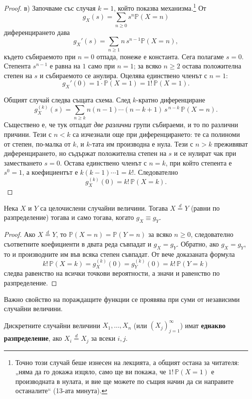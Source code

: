 \begin{proof}
в) Започваме със случая $k=1$, който показва механизма.\footnote{Точно този случай беше изнесен на лекцията, а общият остана за читателя: „няма да го докажа изцяло, само ще ви покажа, че $1!\,\mathbb{P}(X=1)$ е производната в нулата, и вие ще можете по същия начин да си направите останалите“ (13-ата минута).} От
\[ g_X(s) = \sum_{n \ge 0} s^n \mathbb{P}(X=n) \]
диференцирането дава
\[ g_X'(s) = \sum_{n \ge 1} n\, s^{n-1} \mathbb{P}(X=n), \]
където събираемото при $n=0$ отпада, понеже е константа. Сега полагаме $s=0$. Степента
$s^{n-1}$ е равна на $1$ само при $n=1$; за всяко $n \ge 2$ остава положителна степен на
$s$ и събираемото се анулира. Оцелява единствено членът с $n=1$:
\[ g_X'(0) = 1 \cdot \mathbb{P}(X=1) = 1!\,\mathbb{P}(X=1). \]

Общият случай следва същата схема. След $k$-кратно диференциране
\[
  g_X^{(k)}(s) = \sum_{n \ge k} n(n-1)\cdots(n-k+1)\, s^{\,n-k}\, \mathbb{P}(X=n) .
\]
Съществено е, че тук отпадат \emph{две различни} групи събираеми, и то по различни
причини. Тези с $n < k$ са изчезнали още при диференцирането: те са полиноми от степен,
по-малка от $k$, и $k$-тата им производна е нула. Тези с $n > k$ преживяват
диференцирането, но съдържат положителна степен на $s$ и се нулират чак при заместването
$s=0$. Остава единствено членът с $n=k$, при който степента е $s^0 = 1$, а коефициентът е
$k(k-1)\cdots 1 = k!$. Следователно
\[ g_X^{(k)}(0) = k!\,\mathbb{P}(X=k) . \]
\end{proof}

\begin{cor}
Нека $X$ и $Y$ са целочислени случайни величини. Тогава $X \stackrel{d}{=} Y$ (равни по разпределение) тогава и само тогава, когато $g_X \equiv g_Y$.
\end{cor}

\begin{proof}
Ако $X\stackrel{d}{=}Y$, то $\mathbb{P}(X=n)=\mathbb{P}(Y=n)$ за всяко $n\ge0$, следователно съответните коефициенти в двата реда съвпадат и $g_X=g_Y$. Обратно, ако $g_X=g_Y$, то и производните им във всяка степен съвпадат. От вече доказаната формула
\[
k!\,\mathbb{P}(X=k)=g_X^{(k)}(0)=g_Y^{(k)}(0)=k!\,\mathbb{P}(Y=k)
\]
следва равенство на всички точкови вероятности, а значи и равенство по разпределение.
\end{proof}


Важно свойство на пораждащите функции се проявява при суми от независими случайни величини. 

\begin{defn}
Дискретните случайни величини $X_1, \dots, X_n$ (или $(X_j)_{j=1}^\infty$) имат \textbf{еднакво разпределение}, ако $X_i \stackrel{d}{=} X_j$ за всеки $i, j$.
\end{defn}


